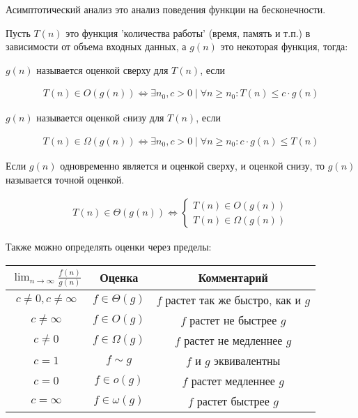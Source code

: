
Асимптотический анализ это анализ поведения функции на бесконечности.

Пусть \(T(n)\) это функция 'количества работы' (время, память и т.п.) в
зависимости от объема входных данных, а \(g(n)\) это некоторая функция, тогда:

\begin{definition}
  \(g(n)\) называется оценкой сверху для \(T(n)\), если

  \begin{align*}
    T(n) \in O(g(n)) \iff
      \exists n_{0}, c > 0 \mid \forall n \ge n_{0} \colon T(n) \le c \cdot g(n)
  \end{align*}
\end{definition}

\begin{definition}
  \(g(n)\) называется оценкой cнизу для \(T(n)\), если
  
  \begin{align*}
    T(n) \in \Omega(g(n)) \iff
      \exists n_{0}, c > 0 \mid \forall n \ge n_{0} \colon c \cdot g(n) \le T(n)
  \end{align*}
\end{definition}

\begin{definition}
  Если \(g(n)\) одновременно является и оценкой сверху, и оценкой снизу, то
  \(g(n)\) называется точной оценкой.

  \begin{align*}
    T(n) \in \Theta(g(n)) \iff \begin{cases}
      T(n) \in O(g(n)) \\
      T(n) \in \Omega(g(n))
    \end{cases}
  \end{align*}
\end{definition}

Также можно определять оценки через пределы:

\begin{table}[H]
  \centering

  \renewcommand{\arraystretch}{1.5}
  \begin{tabular}{c|c|c}
    \(\lim_{n \to \infty} \frac{f(n)}{g(n)}\) & Оценка & Комментарий
    \\ \hline 
    \(c \neq 0, c \neq \infty\)
      & \(f \in \Theta(g)\)
      & \(f\) растет так же быстро, как и \(g\)
    \\
    \(c \neq \infty\)
      & \(f \in O(g)\)
      & \(f\) растет не быстрее \(g\)
    \\
      \(c \neq 0\)
        & \(f \in \Omega(g)\)
        & \(f\) растет не медленнее \(g\)
    \\
      \(c = 1\)
        & \(f \sim g\)
        & \(f\) и \(g\) эквивалентны
    \\
      \(c = 0\)
        & \(f \in o(g)\)
        & \(f\) растет медленнее \(g\)
    \\
      \(c = \infty\)
        & \(f \in \omega(g)\)
        & \(f\) растет быстрее \(g\)
  \end{tabular}
\end{table}


